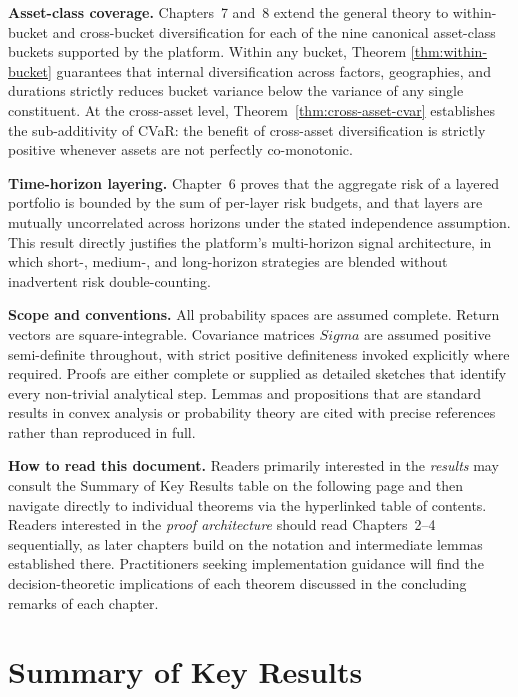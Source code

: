 \documentclass[12pt,openany]{book}
\newcommand{\bfSigma}{\boldsymbol{\Sigma}}
\numberwithin{equation}{chapter}
\theoremstyle{plain}
\theoremstyle{definition}
\theoremstyle{remark}
\def\bfSigma{Sigma}%
\begin{document}
\medskip
\noindent\textbf{Asset-class coverage.}\quad
Chapters~7 and~8 extend the general theory to within-bucket and
cross-bucket diversification for each of the nine canonical asset-class
buckets supported by the platform.  Within any bucket, Theorem
\ref{thm:within-bucket} guarantees that internal diversification
across factors, geographies, and durations strictly reduces bucket
variance below the variance of any single constituent.  At the
cross-asset level, Theorem~\ref{thm:cross-asset-cvar} establishes
the sub-additivity of CVaR: the benefit of cross-asset diversification
is strictly positive whenever assets are not perfectly co-monotonic.

\medskip
\noindent\textbf{Time-horizon layering.}\quad
Chapter~6 proves that the aggregate risk of a layered portfolio is
bounded by the sum of per-layer risk budgets, and that layers are
mutually uncorrelated across horizons under the stated independence
assumption.  This result directly justifies the platform's
multi-horizon signal architecture, in which short-, medium-, and
long-horizon strategies are blended without inadvertent risk
double-counting.

\medskip
\noindent\textbf{Scope and conventions.}\quad
All probability spaces are assumed complete.  Return vectors are
square-integrable.  Covariance matrices $\bfSigma$ are assumed
positive semi-definite throughout, with strict positive definiteness
invoked explicitly where required.  Proofs are either complete or
supplied as detailed sketches that identify every non-trivial
analytical step.  Lemmas and propositions that are standard results
in convex analysis or probability theory are cited with precise
references rather than reproduced in full.

\medskip
\noindent\textbf{How to read this document.}\quad
Readers primarily interested in the \emph{results} may consult the
Summary of Key Results table on the following page and then navigate
directly to individual theorems via the hyperlinked table of contents.
Readers interested in the \emph{proof architecture} should read
Chapters~2–4 sequentially, as later chapters build on the notation
and intermediate lemmas established there.  Practitioners seeking
implementation guidance will find the decision-theoretic implications
of each theorem discussed in the concluding remarks of each chapter.


\chapter*{Summary of Key Results}
\end{document}
